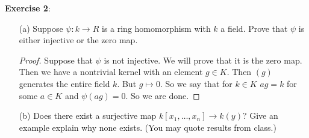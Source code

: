\documentclass{article}
\begin{document}
\textbf{Exercise 2}: 
    \begin{itemize}
        \item [(a)] Suppose $\psi : k \rightarrow R$ is a ring homomorphism with $k$ a field. Prove that $\psi$ is either injective or the zero map.
            \begin{proof}
                Suppose that $\psi$ is not injective. We will prove that it is the zero map. Then we have a nontrivial kernel with an element $g \in K$. Then $(g)$ generates the entire field $k$. But $g \mapsto 0$. So we say that for $k \in K$ $ag = k$ for some $a \in K$ and $\psi(ag) = 0$. So we are done.
            \end{proof}

        \item [(b)] Does there exist a surjective map $k[x_{1}, \ldots , x_{n}] \rightarrow k(y)$? Give an example explain why none exists. (You may quote results from class.) 
    \end{itemize}
\end{document}
